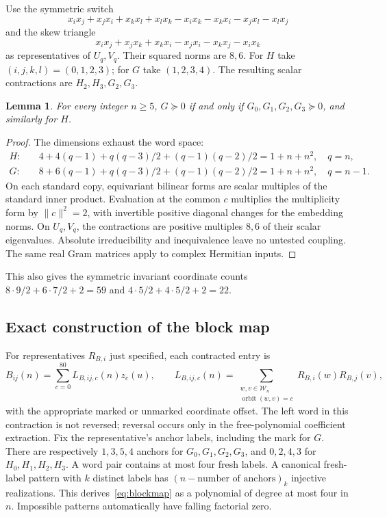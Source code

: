 \documentclass[11pt]{article}
\newtheorem{lemma}[theorem]{Lemma}
\newcommand{\W}{\mathcal W}
\begin{document}
Use the symmetric switch
\[
 x_ix_j+x_jx_i+x_kx_l+x_lx_k-x_ix_k-x_kx_i-x_jx_l-x_lx_j
\]
and the skew triangle
\[
 x_ix_j+x_jx_k+x_kx_i-x_jx_i-x_kx_j-x_ix_k
\]
as representatives of $U_q,V_q$. Their squared norms are $8,6$.
For $H$ take $(i,j,k,l)=(0,1,2,3)$; for $G$ take $(1,2,3,4)$.
The resulting scalar contractions are $H_2,H_3,G_2,G_3$.

\begin{lemma}\label{lem:blocks}
For every integer $n\ge5$, $G\succeq0$ if and only if
$G_0,G_1,G_2,G_3\succeq0$, and similarly for $H$.
\end{lemma}
\begin{proof}
The dimensions exhaust the word space:
\begin{align*}
 H:&\quad4+4(q-1)+q(q-3)/2+(q-1)(q-2)/2=1+n+n^2,\quad q=n,\\
 G:&\quad8+6(q-1)+q(q-3)/2+(q-1)(q-2)/2=1+n+n^2,\quad q=n-1.
\end{align*}
On each standard copy, equivariant bilinear forms are scalar multiples
of the standard inner product. Evaluation at the common $c$ multiplies
the multiplicity form by $\|c\|^2=2$, with invertible positive diagonal
changes for the embedding norms. On $U_q,V_q$, the contractions are
positive multiples $8,6$ of their scalar eigenvalues. Absolute
irreducibility and inequivalence leave no untested coupling.
The same real Gram matrices apply to complex Hermitian inputs.
\end{proof}
This also gives the symmetric invariant coordinate counts
$8\cdot9/2+6\cdot7/2+2=59$ and $4\cdot5/2+4\cdot5/2+2=22$.

\subsection{Exact construction of the block map}
For representatives $R_{B,i}$ just specified, each contracted entry is
\begin{equation}\label{eq:blockmap}
 B_{ij}(n)=\sum_{c=0}^{80}L_{B,ij,c}(n)z_c(u),\qquad
 L_{B,ij,c}(n)=\sum_{\substack{w,v\in\W_n\\\operatorname{orbit}(w,v)=c}}
 R_{B,i}(w)R_{B,j}(v),
\end{equation}
with the appropriate marked or unmarked coordinate offset. The left
word in this contraction is not reversed; reversal occurs only in
the free-polynomial coefficient extraction.
Fix the representative's anchor labels, including the mark for $G$.
There are respectively $1,3,5,4$ anchors for $G_0,G_1,G_2,G_3$, and
$0,2,4,3$ for $H_0,H_1,H_2,H_3$. A word pair contains at most four
fresh labels. A canonical fresh-label pattern with $k$ distinct labels
has $(n-\text{number of anchors})_k$ injective realizations.
This derives~\eqref{eq:blockmap} as a polynomial of degree at most four
in $n$. Impossible patterns automatically have falling factorial zero.
\end{document}
